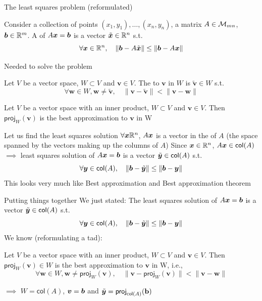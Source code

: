 \documentclass[aspectratio=169]{beamer}
\begin{document}
\begin{frame}{The least squares problem (reformulated)}
\begin{definition}
Consider a collection of points $(x_1,y_1),\ldots,(x_n,y_n)$, a matrix $A\in\mathcal{M}_{mn}$, $\bm{b}\in\mathbb{R}^m$. A  of $A\bm{x}=\bm{b}$ is a vector $\tilde {\bm{x}}\in\mathbb{R}^n$ s.t.
\[
\forall \bm{x}\in\mathbb{R}^n,\quad \|\bm{b}-A\tilde{\bm{x}}\|\leq \|\bm{b}-A\bm{x}\|
\]
\end{definition}
\end{frame}


\begin{frame}{Needed to solve the problem}
\begin{definition}
Let $V$ be a vector space, $W\subset V$ and $\mathbf{v}\in V$. The  to $\mathbf{v}$ in $W$ is $\tilde{\mathbf{v}}\in W$ s.t.
\[
\forall\mathbf{w}\in W, \mathbf{w}\neq\tilde{\mathbf{v}}, \quad
\|\mathbf{v}-\tilde{\mathbf{v}}\| < \|\mathbf{v}-\mathbf{w}\|
\]
\end{definition}
\vfill
\begin{theorem}
Let $V$ be a vector space with an inner product, $W\subset V$ and $\mathbf{v}\in V$. Then $\mathsf{proj}_W(\mathbf{v})$ is the best approximation to $\mathbf{v}$ in W
\end{theorem}
\end{frame}


\begin{frame}{Let us find the least squares solution}
$\forall \bm{x}\mathbb{R}^n$, $A\bm{x}$ is a vector in the  of $A$ (the space spanned by the vectors making up the columns of $A$)
\vfill
Since $\bm{x}\in\mathbb{R}^n$, $A\bm{x}\in\mathsf{col}(A)$
\vfill
$\implies$ least squares solution of $A\bm{x}=\bm{b}$ is a vector $\tilde{\bm{y}}\in\mathsf{col}(A)$ s.t.
\[
\forall\bm{y}\in\mathsf{col}(A),\quad\|\bm{b}-\tilde{\bm{y}}\|\leq\|\bm{b}-\bm{y}\|
\]
\vfill
This looks very much like Best approximation and Best approximation theorem
\end{frame}

\begin{frame}{Putting things together}
We just stated: The least squares solution of $A\bm{x}=\bm{b}$ is a vector $\tilde{\bm{y}}\in\mathsf{col}(A)$ s.t.
\[
\forall\bm{y}\in\mathsf{col}(A),\quad\|\bm{b}-\tilde{\bm{y}}\|\leq\|\bm{b}-\bm{y}\|
\]
\vfill
We know (reformulating a tad):
\begin{theorem}
Let $V$ be a vector space with an inner product, $W\subset V$ and $\mathbf{v}\in V$. Then $\mathsf{proj}_W(\mathbf{v})\in W$ is the best approximation to $\mathbf{v}$ in W, i.e.,
\[
\forall\mathbf{w}\in W, \mathbf{w}\neq\mathsf{proj}_W(\mathbf{v}), \quad
\|\mathbf{v}-\mathsf{proj}_W(\mathbf{v})\| < \|\mathbf{v}-\mathbf{w}\|
\]
\end{theorem}
\vfill
$\implies$ $W=\mathsf{col}(A)$, $\bm{v}=\bm{b}$ and $\tilde{\bm{y}}=\mathsf{proj}_{\mathsf{col}(A)}(\mathbf{b})$
\end{frame}
\end{document}
